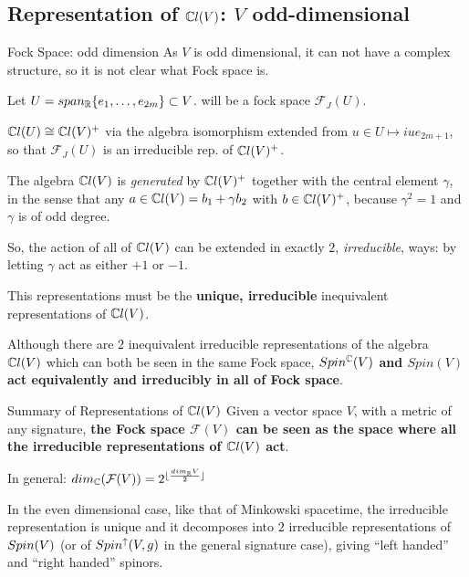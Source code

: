 \subsection{Representation of $\mathbb C l(V)$: $V$ odd-dimensional}

\begin{frame}{Fock Space: odd dimension} %
    As $V$ is odd dimensional, it can not have a complex structure, so it is not clear what Fock space is.
    
    Let $U = span_\mathbb R\{e_1, \dots, e_{2m}\} \subset V$.  will be a fock space $\mathcal F_J(U)$.
    
    $\mathbb C l(U) \cong \mathbb C l(V)^+$ via the algebra isomorphism extended from $u \in U \mapsto iue_{2m+1}$, so that $\mathcal F_J(U)$ is an irreducible rep. of $\mathbb C l(V)^+$.
    
    The algebra $\mathbb C l(V)$ is \emph{generated} by $\mathbb C l(V)^+$ together with the central element $\gamma$, in the sense that any $a \in \mathbb C l(V) = b_1 + \gamma b_2$ with $b \in \mathbb C l(V)^+$, because $\gamma^2 = 1$ and $\gamma$ is of odd degree.
    

\end{frame}

\begin{frame} %
    So, the action of all of $\mathbb C l(V)$ can be extended in exactly $2$, \emph{irreducible}, ways: by letting $\gamma$ act as either $+1$ or $-1$. 
    
    This representations must be the \textbf{unique, irreducible} inequivalent representations of $\mathbb C l(V)$.    
    
    Although there are $2$ inequivalent irreducible representations of the algebra $\mathbb C l(V)$ which can both be seen in the same Fock space, \textbf{$Spin^\mathbb C(V)$ and $Spin(V)$ act equivalently and irreducibly in all of Fock space}.
    
\end{frame}

\begin{frame}{Summary of Representations of $\mathbb C l(V)$} %
    Given a vector space $V$, with a metric of any signature, \textbf{the Fock space $\mathcal F(V)$ can be seen as the space where all the irreducible representations of $\mathbb C l(V)$ act}.

    In general: $dim_\mathbb C (\mathcal F(V)) = 2^{\lfloor\frac{dim_\mathbb R V}{2} \rfloor}$
    
    In the even dimensional case, like that of Minkowski spacetime, the irreducible representation is unique and it decomposes into $2$ irreducible representations of $Spin(V)$ (or of $Spin^\uparrow(V, g)$ in the general signature case), giving ``left handed'' and ``right handed'' spinors. %
\end{frame}